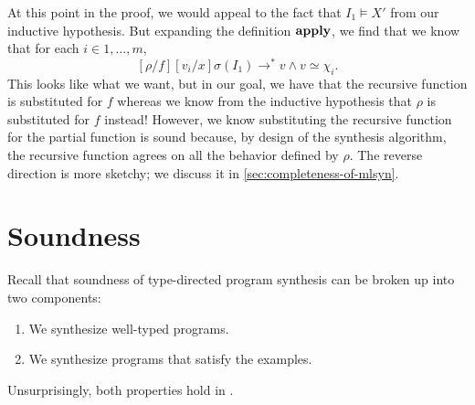 At this point in the proof, we would appeal to the fact that $I_1 ⊨ Χ'$ from our inductive hypothesis.
But expanding the definition $\mathbf{apply}$, we find that we know that for each $i ∈ 1, …, m$,
\[
  [ρ/f][v_i/x]σ(I_1) →^* v ∧ v ≃ χ_i.
\]
This looks like what we want, but in our goal, we have that the recursive function is substituted for $f$ whereas we know from the inductive hypothesis that $ρ$ is substituted for $f$ instead!
However, we know substituting the recursive function for the partial function is sound because, by design of the synthesis algorithm, the recursive function agrees on all the behavior defined by $ρ$.
The reverse direction is more sketchy; we discuss it in \autoref{sec:completeness-of-mlsyn}.

\section{Soundness}

Recall that soundness of type-directed program synthesis can be broken up into two components:
\begin{enumerate}
  \item We synthesize well-typed programs.
  \item We synthesize programs that satisfy the examples.
\end{enumerate}
Unsurprisingly, both properties hold in \mlsyn{}.

